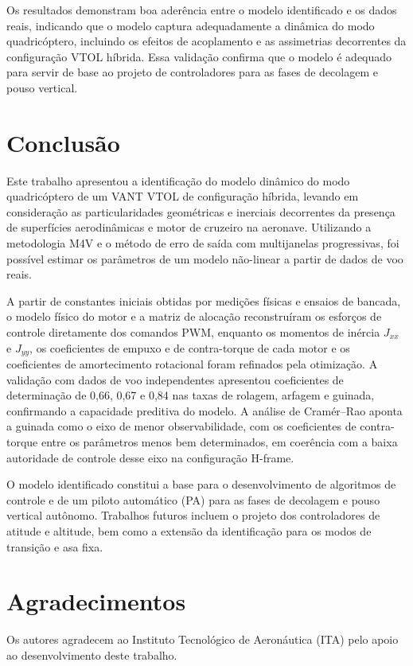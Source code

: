 \documentclass{ieeeaccess}
\begin{document}
Os resultados demonstram boa aderência entre o modelo identificado e os dados reais, indicando que o modelo captura adequadamente a dinâmica do modo quadricóptero, incluindo os efeitos de acoplamento e as assimetrias decorrentes da configuração VTOL híbrida. Essa validação confirma que o modelo é adequado para servir de base ao projeto de controladores para as fases de decolagem e pouso vertical.

\section{Conclusão}
\label{sec:conclusao}

Este trabalho apresentou a identificação do modelo dinâmico do modo quadricóptero de um VANT VTOL de configuração híbrida, levando em consideração as particularidades geométricas e inerciais decorrentes da presença de superfícies aerodinâmicas e motor de cruzeiro na aeronave. Utilizando a metodologia M4V e o método de erro de saída com multijanelas progressivas, foi possível estimar os parâmetros de um modelo não-linear a partir de dados de voo reais.

A partir de constantes iniciais obtidas por medições físicas e ensaios de bancada, o modelo físico do motor e a matriz de alocação reconstruíram os esforços de controle diretamente dos comandos PWM, enquanto os momentos de inércia $J_{xx}$ e $J_{yy}$, os coeficientes de empuxo e de contra-torque de cada motor e os coeficientes de amortecimento rotacional foram refinados pela otimização. A validação com dados de voo independentes apresentou coeficientes de determinação de 0,66, 0,67 e 0,84 nas taxas de rolagem, arfagem e guinada, confirmando a capacidade preditiva do modelo. A análise de Cramér--Rao aponta a guinada como o eixo de menor observabilidade, com os coeficientes de contra-torque entre os parâmetros menos bem determinados, em coerência com a baixa autoridade de controle desse eixo na configuração H-frame.

O modelo identificado constitui a base para o desenvolvimento de algoritmos de controle e de um piloto automático (PA) para as fases de decolagem e pouso vertical autônomo. Trabalhos futuros incluem o projeto dos controladores de atitude e altitude, bem como a extensão da identificação para os modos de transição e asa fixa.

\section*{Agradecimentos}
Os autores agradecem ao Instituto Tecnológico de Aeronáutica (ITA) pelo apoio ao desenvolvimento deste trabalho.
\end{document}
